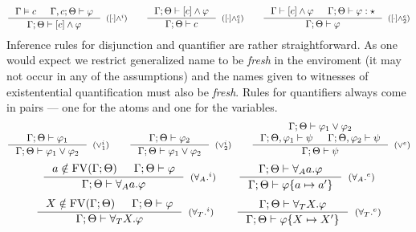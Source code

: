\documentclass[english, mgr]{iithesis}
\begin{document}
\begin{eqnarray*}
  \inference{
    \cjgmnt[\cEnv]{\constr} &
    \jgmnt[\cEnv, \constr;\Theta]{\formphi}
  }{
    \jgmnt[\cEnv;\Theta]{\fCAnd{\constr}\formphi}
  }[(\ensuremath{\fCAnd{\cdot}^i})]
  \qquad
  \inference{
    \jgmnt[\cEnv;\Theta]{\fCAnd{\constr}\formphi}
    }{
    \jgmnt[\cEnv;\Theta]{\constr}
  }[(\ensuremath{\fCAnd{\cdot}^e_1})]\qquad
  \inference{
    \jgmnt[\cEnv]{\fCAnd{\constr}\formphi} &
    \jgmnt[\cEnv;\Theta]{\formphi: \kProp}
    }{
    \jgmnt[\cEnv;\Theta]{\formphi}
  }[(\ensuremath{\fCAnd{\cdot}^e_2})]
\end{eqnarray*}
Inference rules for disjunction and quantifier are rather straightforward.
As one would expect we restrict generalized name to be \textit{fresh} in the enviroment (it may not occur in any of the assumptions)
and the names given to witnesses of existentential quantification must also be \textit{fresh}.
Rules for quantifiers always come in pairs --- one for the atoms and one for the variables.
\begin{eqnarray*}
  \inference{
    \jgmnt[\cEnv;\Theta]{\formphi_1}
    }{
    \jgmnt[\cEnv;\Theta]{\formphi_1 \vee \formphi_2}
  }[(\ensuremath{\vee^i_1})]
  \qquad
  \inference{
    \jgmnt[\cEnv;\Theta]{\formphi_2}
  }{
    \jgmnt[\cEnv;\Theta]{\formphi_1 \vee \formphi_2}
  }[(\ensuremath{\vee^i_2})]
  \qquad
  \inference{
    \jgmnt[\cEnv;\Theta]{\formphi_1 \vee \formphi_2} \\
    \jgmnt[\cEnv;\Theta,\formphi_1]{\psi} &
    \jgmnt[\cEnv;\Theta,\formphi_2]{\psi}
  }{
    \jgmnt[\cEnv;\Theta]{\psi}
  }[(\ensuremath{\vee^e})]
\end{eqnarray*}
\begin{eqnarray*}
  \inference{
    \atomv \notin \fv[\cEnv;\Theta] &
    \jgmnt[\cEnv;\Theta]{\formphi}
  }{
    \jgmnt[\cEnv;\Theta]{\fForallAtom{\atomv}\formphi}
  }[(\ensuremath{{\fForallAtom{}}^i})]
  \qquad
  \inference{
    \jgmnt[\cEnv;\Theta]{\fForallAtom{\atomv}\formphi}
  }{
    \jgmnt[\cEnv;\Theta]{\formphi \{\atomv \mapsto \atomv'\}}
  }[(\ensuremath{{\fForallAtom{}}^e})]
\end{eqnarray*}
\begin{eqnarray*}
  \inference{
    \termv \notin \fv[\cEnv;\Theta] &
    \jgmnt[\cEnv;\Theta]{\formphi}
  }{
    \jgmnt[\cEnv;\Theta]{\fForallTerm{\termv}\formphi}
  }[(\ensuremath{{\fForallTerm{}}^i})]
  \qquad
  \inference{
    \jgmnt[\cEnv;\Theta]{\fForallTerm{\termv}\formphi}
  }{
    \jgmnt[\cEnv;\Theta]{\formphi \{\termv \mapsto \termv'\}}
  }[(\ensuremath{{\fForallTerm{}}^e})]
\end{eqnarray*}
\end{document}
